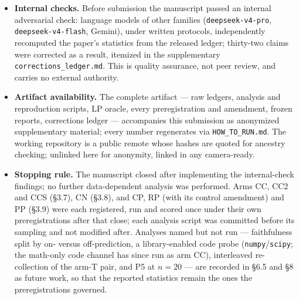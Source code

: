 \begin{itemize}
  sampling, made the final inclusion, stopping and submission decisions, and is solely
  responsible for the content. The claim a reader can check is the ordering, not the
  authorship: each preregistration commit is a git ancestor of the sampling it governs.
  Because the drafting models share a family with arms under study (\S5), what a reader is
  asked to trust is the released artifact --- the scripts, raw ledgers, LP oracle and frozen
  outputs, all of which accompany this submission as anonymized supplementary material --- not the author.
\item \textbf{Internal checks.} Before submission the manuscript passed an internal adversarial
  check: language models of other families (\texttt{deepseek-v4-pro}, \texttt{deepseek-v4-flash},
  Gemini), under written protocols, independently recomputed the paper's statistics from the
  released ledger; thirty-two claims were corrected as a result, itemized in the supplementary
  \texttt{corrections\_ledger.md}. This is quality assurance, not peer review, and carries no
  external authority.
\item \textbf{Artifact availability.} The complete artifact --- raw ledgers, analysis and
  reproduction scripts, LP oracle, every preregistration and amendment, frozen reports,
  corrections ledger --- accompanies this submission as anonymized supplementary material;
  every number regenerates via \texttt{HOW\_TO\_RUN.md}. The working repository is a public
  remote whose hashes are quoted for ancestry checking; unlinked here for anonymity, linked
  in any camera-ready.
\item \textbf{Stopping rule.} The manuscript closed after implementing the internal-check
  findings; no further data-dependent analysis was performed. Arms CC, CC2 and CCS (\S3.7), CN (\S3.8),
  and CP, RP (with its control amendment) and PP (\S3.9)
  were each registered, run and scored once under their own preregistrations after that
  close; each analysis script was committed before its sampling and not modified after. Analyses named but
  not run --- faithfulness split by on- versus off-prediction, a library-enabled code probe
  (\texttt{numpy}/\texttt{scipy}; the math-only code channel has since run as arm CC), interleaved
  re-collection of the arm-T pair, and P5 at $n = 20$ --- are recorded in \S6.5 and \S8 as future work,
  so that the reported statistics remain the ones the preregistrations governed.
\end{itemize}
